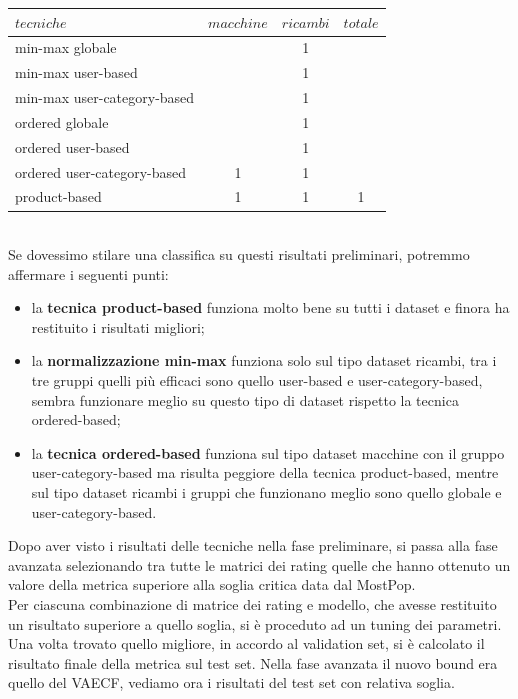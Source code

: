\begin{tabular}{|l|ccc|}
    \toprule
    $tecniche$  & $macchine$ & $ricambi$ & $totale$   \\
    \midrule
    min-max globale             &   & 1 &   \\
    min-max user-based          &   & 1 &   \\
    min-max user-category-based &   & 1 &   \\
    \bottomrule
    ordered globale             &   & 1 &   \\
    ordered user-based          &   & 1 &   \\
    ordered user-category-based & 1 & 1 &   \\
    \bottomrule
    product-based               & 1 & 1 & 1  \\
    \bottomrule
\end{tabular}\\

Se dovessimo stilare una classifica su questi risultati preliminari, potremmo affermare i seguenti punti:
\begin{itemize}
    \item la \textbf{tecnica product-based} funziona molto bene su tutti i dataset e finora ha restituito i risultati migliori;
    \item la \textbf{normalizzazione min-max} funziona solo sul tipo dataset ricambi, tra i tre gruppi quelli più efficaci sono quello user-based e user-category-based, sembra funzionare meglio su questo tipo di dataset rispetto la tecnica ordered-based;
    \item la \textbf{tecnica ordered-based} funziona sul tipo dataset macchine con il gruppo user-category-based ma risulta peggiore della tecnica product-based, mentre sul tipo dataset ricambi i gruppi che funzionano meglio sono quello globale e user-category-based.
\end{itemize}

Dopo aver visto i risultati delle tecniche nella fase preliminare, si passa alla fase avanzata selezionando tra tutte le matrici dei rating quelle che hanno ottenuto un valore della metrica superiore alla soglia critica data dal MostPop. \\
Per ciascuna combinazione di matrice dei rating e modello, che avesse restituito un risultato superiore a quello soglia, si è proceduto ad un tuning dei parametri. Una volta trovato quello migliore, in accordo al validation set, si è calcolato il risultato finale della metrica sul test set.
Nella fase avanzata il nuovo bound era quello del VAECF, vediamo ora i risultati del test set con relativa soglia.\\

